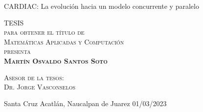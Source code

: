 \documentclass[
    fontsize=11pt,
    a4paper
   ]{scrbook}
\begin{document}
\begin{titlepage}
\begin{minipage}[c][0.81\textheight][t]{0.65\textwidth}
\begin{center}
                {\Huge CARDIAC: La evolución hacia un modelo concurrente y paralelo}\\[.3in]

                \vspace{2cm}            

                \textsc{\LARGE TESIS}\\[0.5cm]
                \textsc{\large para obtener el título de}\\[0.5cm]
                \textsc{\large Matemáticas Aplicadas y Computación}\\[0.5cm]
                \textsc{\large presenta}\\[0.5cm]
                \textsc{\large \textbf{Martín Osvaldo Santos Soto}}\\[2cm]          

                \vspace{0.5cm}

                {\large\scshape Asesor de la tesos:\\[0.3cm] {Dr. Jorge Vasconselos}}\\[.2in]

                \vspace{0.5cm}

                {Santa Cruz Acatlán, Naucalpan de Juarez}{ }{01/03/2023}
            \end{center}
        \end{minipage}
    \end{titlepage}
\end{document}
